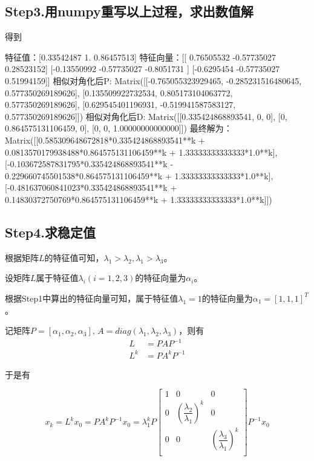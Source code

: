 \subsection{Step3.用numpy重写以上过程，求出数值解}

得到
\begin{python}
    特征值：[0.33542487 1.         0.86457513]
特征向量：[[ 0.76505532 -0.57735027  0.28523152]
 [-0.13550992 -0.57735027 -0.8051731 ]
 [-0.6295454  -0.57735027  0.51994159]]
相似对角化后P:
Matrix([[-0.765055323929465, -0.285231516480645, 0.577350269189626], [0.135509922732534, 0.805173104063772, 0.577350269189626], [0.629545401196931, -0.519941587583127, 0.577350269189626]])
相似对角化后D:
Matrix([[0.335424868893541, 0, 0], [0, 0.864575131106459, 0], [0, 0, 1.00000000000000]])
最终解为：
Matrix([[0.585309648672818*0.335424868893541**k + 0.0813570179938488*0.864575131106459**k + 1.33333333333333*1.0**k], 
[-0.103672587831795*0.335424868893541**k - 0.229660745501538*0.864575131106459**k + 1.33333333333333*1.0**k],
 [-0.481637060841023*0.335424868893541**k + 0.14830372750769*0.864575131106459**k + 1.33333333333333*1.0**k]])

\end{python}

\subsection{Step4.求稳定值}

根据矩阵$L$的特征值可知，$\lambda_1 > \lambda_2, \lambda_1 > \lambda_3$。

设矩阵$L$属于特征值$\lambda_i(i=1,2,3)$的特征向量为$\alpha_i$。

根据Step1中算出的特征向量可知，属于特征值$\lambda_1=1$的特征向量为$\alpha_1 = [1,1,1]^T$。

记矩阵$P=[\alpha_1, \alpha_2, \alpha_3]$, $A = diag(\lambda_1, \lambda_2, \lambda_3)$，则有
\begin{equation}
    \begin{split}
    L &=PAP^{-1}
    \\
    L^k &= PA^kP^{-1} 
    \end{split}
\end{equation}

于是有

\begin{equation}
 x_k = L^kx_0 = PA^kP^{-1}x_0 = \lambda_1^kP\begin{bmatrix}
    1 & 0 & 0\\
    0 & (\dfrac{\lambda_2}{\lambda_1})^k& 0\\
    0 & 0 & (\dfrac{\lambda_3}{\lambda_1})^k\\ 
 \end{bmatrix}P^{-1}x_0
\end{equation}

